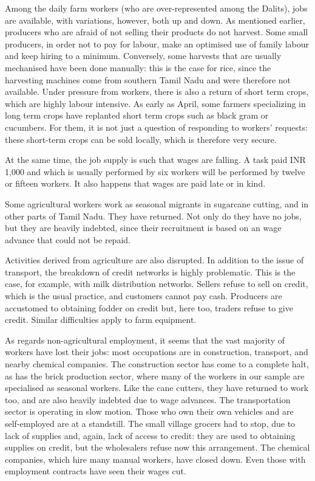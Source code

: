 \documentclass[a4paper, 11pt, onecolumn]{article}
\begin{document}
Among the daily farm workers (who are over-represented among the Dalits), jobs are available, with variations, however, both up and down. As mentioned earlier, producers who are afraid of not selling their products do not harvest. Some small producers, in order not to pay for labour, make an optimised use of family labour and keep hiring to a minimum. Conversely, some harvests that are usually mechanised have been done manually: this is the case for rice, since the harvesting machines come from southern Tamil Nadu and were therefore not available. Under pressure from workers, there is also a return of short term crops, which are highly labour intensive. As early as April, some farmers specializing in long term crops have replanted short term crops such as black gram or cucumbers. For them, it is not just a question of responding to workers' requests: these short-term crops can be sold locally, which is therefore very secure. 

At the same time, the job supply is such that wages are falling. A task paid INR 1,000 and which is usually performed by six workers will be performed by twelve or fifteen workers. It also happens that wages are paid late or in kind. 

Some agricultural workers work as seasonal migrants in sugarcane cutting, and in other parts of Tamil Nadu. They have returned. Not only do they have no jobs, but they are heavily indebted, since their recruitment is based on an wage advance that could not be repaid.

Activities derived from agriculture are also disrupted. In addition to the issue of transport, the breakdown of credit networks is highly problematic. This is the case, for example, with milk distribution networks. Sellers refuse to sell on credit, which is the usual practice, and customers cannot pay cash. Producers are accustomed to obtaining fodder on credit but, here too, traders refuse to give credit. Similar difficulties apply to farm equipment. 

As regards non-agricultural employment, it seems that the vast majority of workers have lost their jobs: most occupations are in construction, transport, and nearby chemical companies. The construction sector has come to a complete halt, as has the brick production sector, where many of the workers in our sample are specialised as seasonal workers. Like the cane cutters, they have returned to work too, and are also heavily indebted due to wage advances. The transportation sector is operating in slow motion. Those who own their own vehicles and are self-employed are at a standstill. The small village grocers had to stop, due to lack of supplies and, again, lack of access to credit: they are used to obtaining supplies on credit, but the wholesalers refuse now this arrangement. The chemical companies, which hire many manual workers, have closed down. Even those with employment contracts have seen their wages cut.
\end{document}
